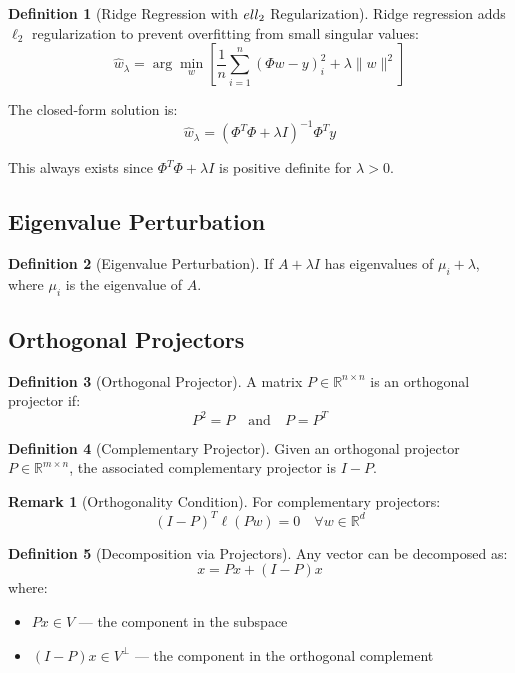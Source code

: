 \documentclass[12pt,a4paper]{article}
\theoremstyle{definition}
\newtheorem{definition}{Definition}[section]
\newtheorem{remark}{Remark}[section]
\begin{document}
\begin{definition}[Ridge Regression with $\\ell_2$ Regularization]
Ridge regression adds $\ell_2$ regularization to prevent overfitting from small singular values:
\[
\hat{w}_\lambda = \arg\min_w \left[\frac{1}{n} \sum_{i=1}^n (\Phi w - y)_i^2 + \lambda \|w\|^2\right]
\]

The closed-form solution is:
\[
\hat{w}_\lambda = (\Phi^T\Phi + \lambda I)^{-1} \Phi^T y
\]

This always exists since $\Phi^T\Phi + \lambda I$ is positive definite for $\lambda > 0$.
\end{definition}

\subsection{Eigenvalue Perturbation}

\begin{definition}[Eigenvalue Perturbation]
If $A + \lambda I$ has eigenvalues of $\mu_i + \lambda$, where $\mu_i$ is the eigenvalue of $A$.
\end{definition}

\subsection{Orthogonal Projectors}

\begin{definition}[Orthogonal Projector]
A matrix $P \in \mathbb{R}^{n \times n}$ is an orthogonal projector if:
\[
P^2 = P \quad \text{and} \quad P = P^T
\]
\end{definition}

\begin{definition}[Complementary Projector]
Given an orthogonal projector $P \in \mathbb{R}^{m \times n}$, the associated complementary projector is $I - P$.
\end{definition}

\begin{remark}[Orthogonality Condition]
For complementary projectors:
\[
(I - P)^T \ell(Pw) = 0 \quad \forall w \in \mathbb{R}^d
\]
\end{remark}

\begin{definition}[Decomposition via Projectors]
Any vector can be decomposed as:
\[
x = Px + (I-P)x
\]
where:
\begin{itemize}
    \item $Px \in V$ — the component in the subspace
    \item $(I-P)x \in V^\perp$ — the component in the orthogonal complement
\end{itemize}
\end{definition}
\end{document}
